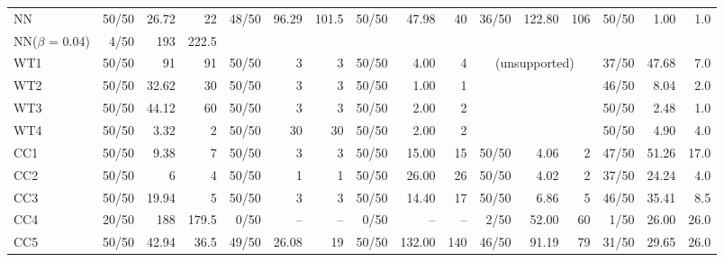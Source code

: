 \begin{table}
{\begin{tabular}{lrrrrrrrrrrrrrrr}
			\cmidrule(r){1-1} \cmidrule(lr){2-4} \cmidrule(lr){5-7} \cmidrule(lr){8-10} \cmidrule(lr){11-13} \cmidrule(lr){14-16}
			NN  &50/50&26.72&22& 48/50 & 96.29 & 101.5   & 50/50 & 47.98 & 40 & 36/50 & 122.80 & 106 &  50/50 & 1.00 & 1.0\\
			
			NN($\beta$ = 0.04)  &4/50&193&222.5&  &  &   &  &  &  &  & & & & &\\			\cmidrule(r){1-1} \cmidrule(lr){2-4} \cmidrule(lr){5-7} \cmidrule(lr){8-10} \cmidrule(lr){11-13} \cmidrule(lr){14-16}
			WT1 &50/50 &91 &91 &50/50 & 3 & 3& 50/50 & 4.00 & 4 & \multicolumn{3}{c}{(unsupported)} &  37/50 & 47.68 & 7.0\\
			WT2 &50/50 &32.62 & 30 &50/50 & 3 & 3& 50/50 & 1.00 & 1 & & & & 46/50 & 8.04 & 2.0\\
			WT3 &50/50 &44.12& 60 &50/50 & 3 & 3& 50/50 & 2.00 & 2 & & & & 50/50 & 2.48 & 1.0\\
			WT4 &50/50 &3.32 &2&50/50 & 30 &30 & 50/50 & 2.00 & 2 & & & & 50/50 & 4.90 & 4.0\\
			\cmidrule(r){1-1} \cmidrule(lr){2-4} \cmidrule(lr){5-7} \cmidrule(lr){8-10} \cmidrule(lr){11-13} \cmidrule(lr){14-16}
			CC1 &50/50 & 9.38  & 7 & 50/50 &  3    & 3 & 50/50 &  15.00 &  15 & 50/50 &  4.06 &  2 & 47/50 & 51.26 & 17.0 \\
			CC2 &50/50 & 6     & 4 & 50/50 &  1    & 1 & 50/50 &  26.00 &  26 & 50/50 &  4.02 &  2 & 37/50 & 24.24 & 4.0\\
			CC3 &50/50 & 19.94 & 5 & 50/50 &  3    & 3 & 50/50 &  14.40 &  17 & 50/50 &  6.86 &  5 & 46/50 & 35.41 & 8.5\\
			CC4 & 20/50   & 188   & 179.5 &  0/50  &   --  & --&  0/50 &     -- &  -- &  2/50 & 52.00 & 60 &  1/50 & 26.00 & 26.0\\
			CC5 &50/50 & 42.94& 36.5 & 49/50 & 26.08 & 19& 50/50 & 132.00 & 140 & 46/50 & 91.19 & 79 & 31/50 & 29.65 & 26.0\\
			\cmidrule(r){1-1} \cmidrule(lr){2-4} \cmidrule(lr){5-7} \cmidrule(lr){8-10} \cmidrule(lr){11-13} \cmidrule(lr){14-16}

\end{tabular}}
\end{table}
